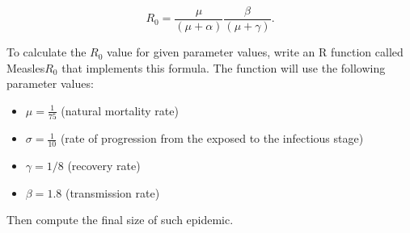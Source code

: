 \documentclass{article}
\begin{document}
\begin{equation*} R_0 = \frac{\mu}{(\mu + \alpha)} \frac{\beta}{(\mu + \gamma)}. \end{equation*}

To calculate the $R_0$ value for given parameter values,  write an R function 
called Measles$R_0$ that implements this formula. The function will use the following parameter values:

    \begin{itemize}
        \item $\mu = \frac{1}{75}$ (natural mortality rate)
        \item $\sigma = \frac{1}{10}$ (rate of progression from the exposed to the infectious stage)
        \item $\gamma = 1/8$ (recovery rate)
        \item $\beta = 1.8$ (transmission rate)
    \end{itemize}
Then compute the final size of such epidemic.
\end{document}
